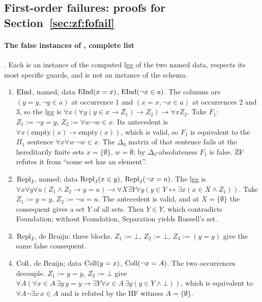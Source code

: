 \subsection{First-order failures: proofs for Section~\ref{sec:zf:fofail}}\label{app:zf:fofail}

\paragraph{The false instances of , complete list} . Each is an instance of the
computed lgg of the two named data, respects its most specific guards, and is not an instance of the schema.
\begin{enumerate}[label=(\arabic*)]
\item $\mathrm{EInd}$, named; data $\mathrm{EInd}(x=x)$, $\mathrm{EInd}(\neg x\in a)$. The columns are $(y=y,\neg y\in a)$ at occurrence 1 and
  $(x=x,\neg x\in a)$ at occurrences 2 and 3, so the lgg is $\forall x(\forall y(y\in x\to Z_1)\to Z_2)\to\forall x Z_2$.
  Take $F_1$: $Z_1:=\neg y=y$, $Z_2:=\forall w\neg w\in x$. Its antecedent is $\forall x(\mathrm{empty}(x)\to
  \mathrm{empty}(x))$, which is valid, so $F_1$ is equivalent to the $\Pi_1$ sentence $\forall x\forall w\,\neg w\in x$.
  The $\Delta_0$ matrix of that sentence fails at the hereditarily finite sets $x=\{\emptyset\}$, $w=\emptyset$; by
  $\Delta_0$-absoluteness $F_1$ is false. ZF refutes it from ``some set has an element''.
\item $\mathrm{Repl}_{\mathrm{J}}$, named; data $\mathrm{Repl}_{\mathrm{J}}(x\in y)$, $\mathrm{Repl}_{\mathrm{J}}(\neg x=a)$. The lgg is $\forall x\forall y\forall u(Z_1\wedge Z_2\to
  y=u)\to\forall X\exists Y\forall y(y\in Y\leftrightarrow\exists x(x\in X\wedge Z_1))$. Take $Z_1:=y=y$, $Z_2:=\neg u=u$.
  The antecedent is valid, and at $X=\{\emptyset\}$ the consequent gives a set $Y$ of all sets. Then $Y\in Y$, which
  contradicts Foundation; without Foundation, Separation yields Russell's set.
\item $\mathrm{Repl}_{\mathrm{J}}$, de Bruijn: three blocks. $Z_1:=\bot$, $Z_2:=\bot$, $Z_3:=(y=y)$ give the same false consequent.
\item $\mathrm{Coll}$, de Bruijn; data $\mathrm{Coll}(y=x)$, $\mathrm{Coll}(\neg x=A)$. The two occurrences decouple. $Z_1:=y=y$, $Z_2:=\bot$
  give $\forall A(\forall x{\in}A\,\exists y\,y=y\to\exists Y\forall x{\in}A\,\exists y(y\in Y\wedge\bot))$, which is
  equivalent to $\forall A\neg\exists x\,x\in A$ and is refuted by the HF witness $A=\{\emptyset\}$.

\end{enumerate}
